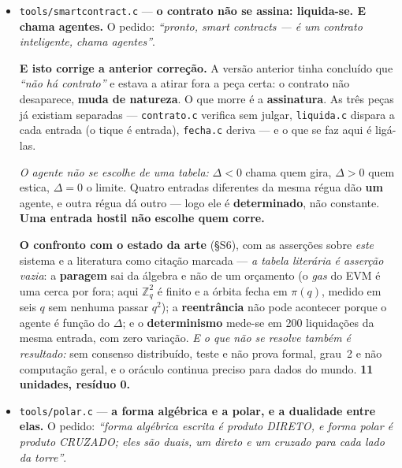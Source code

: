 \documentclass[11pt]{article}
\newcommand{\code}[1]{\texttt{\small #1}}
\theoremstyle{plain}
\theoremstyle{remark}
\begin{document}
\begin{itemize}
\emph{A indireção que a nossa ISA não tem} --- o endereço do slot é imediato --- \textbf{o git
resolve-a pondo-a no DADO e não no opcode}. \emph{E a diferença que pesa:} o git guarda
\textbf{deltas} e nós guardamos a cifra; o delta precisa do objeto-base para se ler, a cifra não
precisa de nada. É a troca de sempre, espaço contra independência.

\textbf{E o medidor recusa-se a medir o vazio:} sem \code{.git} sai com~2, porque \emph{um medidor
sem o objeto a medir não passa nem falha --- não mediu}. \textbf{10 unidades, resíduo 0.}

\item \code{tools/smartcontract.c} --- \textbf{o contrato não se assina: liquida-se. E chama
agentes.} O pedido: \emph{``pronto, smart contracts --- é um contrato inteligente, chama agentes''}.

\textbf{E isto corrige a anterior correção.} A versão anterior tinha concluído que \emph{``não há contrato''} e estava
a atirar fora a peça certa: o contrato não desaparece, \textbf{muda de natureza}. O que morre é a
\textbf{assinatura}. As três peças já existiam separadas --- \code{contrato.c} verifica sem julgar,
\code{liquida.c} dispara a cada entrada (o tique é entrada), \code{fecha.c} deriva --- e o que se
faz aqui é ligá-las.

\emph{O agente não se escolhe de uma tabela:} $\Delta<0$ chama quem gira, $\Delta>0$ quem estica,
$\Delta=0$ o limite. Quatro entradas diferentes da mesma régua dão \textbf{um} agente, e outra régua
dá outro --- logo ele é \textbf{determinado}, não constante. \textbf{Uma entrada hostil não escolhe
quem corre.}

\textbf{O confronto com o estado da arte} (§S6), com as asserções sobre \emph{este} sistema e a
literatura como citação marcada --- \emph{a tabela literária é asserção vazia}: a \textbf{paragem}
sai da álgebra e não de um orçamento (o \emph{gas} do EVM é uma cerca por fora; aqui $\mathbb{Z}_q^2$
é finito e a órbita fecha em $\pi(q)$, medido em seis $q$ sem nenhuma passar $q^2$); a
\textbf{reentrância} não pode acontecer porque o agente é função do $\Delta$; e o \textbf{determinismo}
mede-se em 200 liquidações da mesma entrada, com zero variação. \emph{E o que não se resolve também
é resultado:} sem consenso distribuído, teste e não prova formal, grau~2 e não computação geral, e o
oráculo continua preciso para dados do mundo. \textbf{11 unidades, resíduo 0.}

\item \code{tools/polar.c} --- \textbf{a forma algébrica e a polar, e a dualidade entre elas.}
O pedido: \emph{``forma algébrica escrita é produto DIRETO, e forma polar é produto CRUZADO; eles
são duais, um direto e um cruzado para cada lado da torre''}.


\end{itemize}
\end{document}
